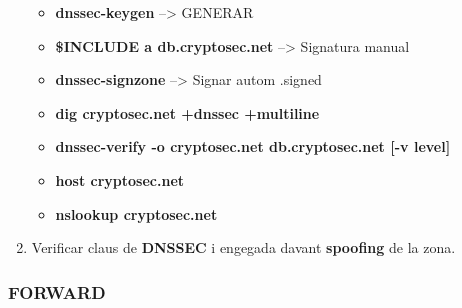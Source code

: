 \documentclass[]{article}
\begin{document}
\begin{enumerate}
  \begin{itemize}
  \item
    \textbf{dnssec-keygen} --\textgreater{} GENERAR
  \item
    \textbf{\$INCLUDE a db.cryptosec.net} --\textgreater{} Signatura
    manual
  \item
    \textbf{dnssec-signzone} --\textgreater{} Signar autom .signed
  \item
    \textbf{dig cryptosec.net +dnssec +multiline}
  \item
    \textbf{dnssec-verify -o cryptosec.net db.cryptosec.net {[}-v
    level{]}}
  \item
    \textbf{host cryptosec.net}
  \item
    \textbf{nslookup cryptosec.net}
  \end{itemize}
\item
  Verificar claus de \textbf{DNSSEC} i engegada davant \textbf{spoofing}
  de la zona.
\end{enumerate}

\hypertarget{forward}{%
\subsubsection{\texorpdfstring{\textbf{FORWARD}}{FORWARD}}\label{forward}}
\end{document}
